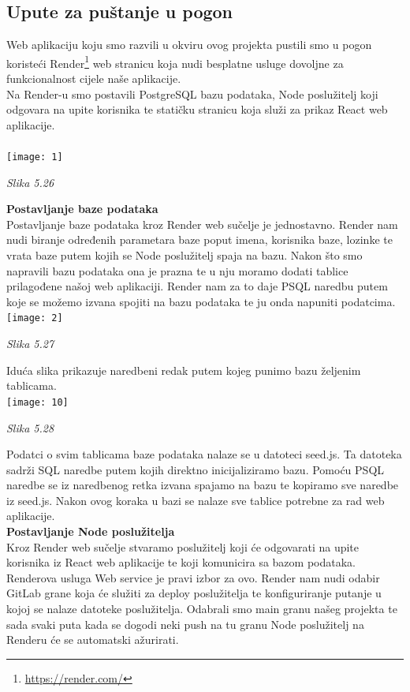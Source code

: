 \documentclass{article}
\begin{document}
	\subsection{Upute za puštanje u pogon}
	Web aplikaciju koju smo razvili u okviru ovog projekta pustili smo u pogon koristeći Render\footnote{\url{https://render.com/}} web stranicu koja nudi besplatne usluge dovoljne za funkcionalnost cijele naše aplikacije. \\
	Na Render-u smo postavili PostgreSQL bazu podataka, Node poslužitelj koji odgovara na upite korisnika te statičku stranicu koja služi za prikaz React web aplikacije. \\
	\\
	\texttt{[image: 1]}
	\begin{center}
		\textit{Slika 5.26}
	\end{center}
	\textbf{Postavljanje baze podataka}\\
	Postavljanje baze podataka kroz Render web sučelje je jednostavno. Render nam nudi biranje određenih parametara baze poput imena, korisnika baze, lozinke te vrata baze putem kojih se Node poslužitelj spaja na bazu. Nakon što smo napravili bazu podataka ona je prazna te u nju moramo dodati tablice prilagođene našoj web aplikaciji. Render nam za to daje PSQL naredbu putem koje se možemo izvana spojiti na bazu podataka te ju onda napuniti podatcima. 
	\texttt{[image: 2]}
	\begin{center}
		\textit{Slika 5.27}
	\end{center}
	
	Iduća slika prikazuje naredbeni redak putem kojeg punimo bazu željenim tablicama.\\
	\texttt{[image: 10]}
	\begin{center}
		\textit{Slika 5.28}
	\end{center}

	
	Podatci o svim tablicama baze podataka nalaze se u datoteci seed.js. Ta datoteka sadrži SQL naredbe putem kojih direktno inicijaliziramo bazu. Pomoću PSQL naredbe se iz naredbenog retka izvana spajamo na bazu te kopiramo sve naredbe iz seed.js. Nakon ovog koraka u bazi se nalaze sve tablice potrebne za rad web aplikacije. \\
	
	\textbf{Postavljanje Node poslužitelja}\\
	Kroz Render web sučelje stvaramo poslužitelj koji će odgovarati na upite korisnika iz React web aplikacije te koji komunicira sa bazom podataka. Renderova usluga Web service je pravi izbor za ovo. Render nam nudi odabir GitLab grane koja će služiti za deploy poslužitelja te konfiguriranje putanje u kojoj se nalaze datoteke poslužitelja. Odabrali smo main granu našeg projekta te sada svaki puta kada se dogodi neki push na tu granu Node poslužitelj na Renderu će se automatski ažurirati. \\
	
\end{document}
